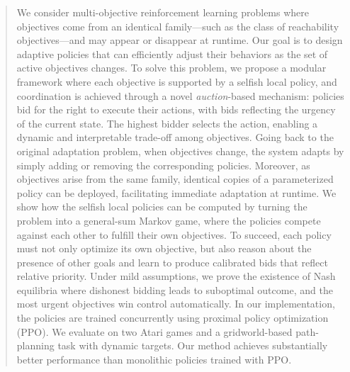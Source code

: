 \begin{abstract}
We consider multi-objective reinforcement learning problems where objectives come from an identical family---such as the class of reachability objectives---and may appear or disappear at runtime.
Our goal is to design adaptive policies that can efficiently adjust their behaviors as the set of active objectives changes.
To solve this problem, we propose a modular framework where each objective is supported by a selfish local policy, and coordination is achieved through a novel \emph{auction}-based mechanism:
policies bid for the right to execute their actions, with bids reflecting the urgency of the current state.
The highest bidder selects the action, enabling a dynamic and interpretable trade-off among objectives.
Going back to the original adaptation problem, when objectives change, the system adapts by simply adding or removing the corresponding policies.
Moreover, as objectives arise from the same family, identical copies of a parameterized policy can be deployed, facilitating immediate adaptation at runtime.
We show how the selfish local policies can be computed by turning the problem into a general-sum Markov game, where the policies compete against each other to fulfill their own objectives.
To succeed, each policy must not only optimize its own objective, but also reason about the presence of other goals and learn to produce calibrated bids that reflect relative priority.
Under mild assumptions, we prove the existence of Nash equilibria where dishonest bidding leads to suboptimal outcome, and the most urgent objectives win control automatically.
In our implementation, the policies are trained concurrently using proximal policy optimization (PPO).
We evaluate on two Atari games and a gridworld-based path-planning task with dynamic targets.
Our method achieves substantially better performance than monolithic policies trained with PPO. 
\end{abstract}